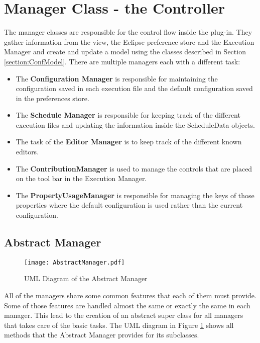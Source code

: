 \section{Manager Class - the Controller}
\label{section:ConfController}
The manager classes are responsible for the control flow inside the plug-in. They gather information
from the view, the Eclipse preference store and the Execution Manager and create and update a
model using the classes described in Section \ref{section:ConfModel}. There are multiple managers
each with a different task:
\begin{itemize}
 \item The \textbf{Configuration Manager} is responsible for maintaining the configuration saved in
each execution file and the default configuration saved in the preferences store.
 \item The \textbf{Schedule Manager} is responsible for keeping track of the different
execution files and updating the information inside the ScheduleData objects.
 \item The task of the \textbf{Editor Manager} is to keep track of the different known editors.
 \item The \textbf{ContributionManager} is used to manage the controls that are placed on the 
tool bar in the Execution Manager.
 \item The \textbf{PropertyUsageManager} is responsible for managing the keys of those
properties where the default configuration is used rather than the current configuration.
\end{itemize}

\subsection{Abstract Manager}
\label{section:AbstractManager}
\begin{figure}
  \centering
  \texttt{[image: AbstractManager.pdf]}
  \caption[UML Diagram of the Abstract Manager]%
  {UML Diagram of the Abstract Manager\protect}
  \label{fig:AbstractManager}
\end{figure}
All of the managers share some common features that each of them must provide. Some of those
features are handled almost the same or exactly the same in each manager. This lead to the creation
of an abstract super class for all managers that takes care of the 
basic tasks. The UML diagram in Figure \ref{fig:AbstractManager} shows all methods that the 
Abstract Manager provides for its subclasses.

